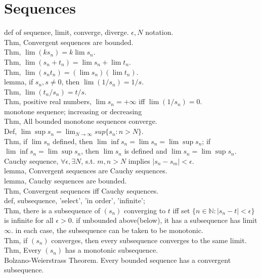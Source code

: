 \documentclass[paper=a4, fontsize=11pt]{scrartcl} %
\numberwithin{equation}{section} %
\numberwithin{figure}{section} %
\numberwithin{table}{section} %
\begin{document}
\section{Sequences}
def of sequence, limit, converge, diverge. $\epsilon, N$ notation.\\
Thm, Convergent sequences are bounded.\\
Thm, $\lim(ks_n) = k\lim s_n$.\\
Thm, $\lim(s_n+t_n)=\lim s_n+ \lim t_n$.\\
Thm, $\lim(s_nt_n)=(\lim s_n) (\lim t_n)$.\\
lemma, if $s_n, s\neq 0$, then $\lim (1/s_n) = 1/s$.\\
Thm, $\lim(t_n/s_n)=t/s$.\\
Thm, positive real numbers, $\lim s_n=+\infty$ iff $\lim(1/s_n) =0$.\\
monotone sequence; increasing or decreasing\\
Thm, All bounded monotone sequences converge.\\
Def, $\lim \sup s_n = \lim_{N\rightarrow\infty} sup\{s_n:n>N\}$.\\
Thm, if $\lim s_n$ defined, then $\lim \inf s_n=\lim s_n =\lim \sup s_n$; if $\lim \inf s_n=\lim \sup s_n$, then $\lim s_n$ is defined and $\lim s_n =\lim \sup s_n$.\\
Cauchy sequence, $\forall\epsilon, \exists N$, s.t. $m,n>N$ implies $|s_n-s_m|<\epsilon$.\\
lemma, Convergent sequences are Cauchy sequences.\\
lemma, Cauchy sequences are bounded.\\
Thm, Convergent sequences iff Cauchy sequences.\\
def, subsequence, 'select', 'in order', 'infinite';\\
Thm, there is a subsequence of $(s_n)$ converging to $t$ iff set $\{n\in\mathbb{N}: |s_n-t|<\epsilon\}$ is infinite for all $\epsilon>0$. if unbounded above(below), it has a subsequence has limit $\infty$. in each case, the subsequence can be taken to be monotonic.\\
Thm, if $(s_n)$ converges, then every subsequence converges to the same limit.\\
Thm, Every $(s_n)$ has a monotonic subsequence.\\
Bolzano-Weierstrass Theorem. Every bounded sequence has a convergent subsequence.\\
\end{document}
